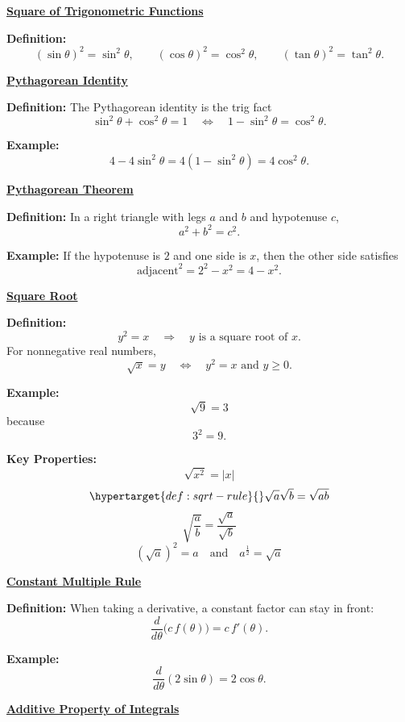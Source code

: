 \documentclass{article}
\newcommand{\defanchor}[1]{\hypertarget{def:#1}{}}
\newcommand{\backtoterm}[2]{\hyperlink{q:#1}{\textbf{#2}}}
\begin{document}
    \defanchor{notation}\backtoterm{notation}{Square of Trigonometric Functions}

    \textbf{Definition:}
    \[
    (\sin\theta)^2=\sin^2\theta,\qquad
    (\cos\theta)^2=\cos^2\theta,\qquad
    (\tan\theta)^2=\tan^2\theta.
    \]

    \defanchor{pyth-id}\backtoterm{pyth-id}{Pythagorean Identity}

    \textbf{Definition:}
    The Pythagorean identity is the trig fact
    \[
    \sin^2\theta+\cos^2\theta=1
    \quad\Longleftrightarrow\quad
    1-\sin^2\theta=\cos^2\theta.
    \]

    \textbf{Example:}
    \[
    4-4\sin^2\theta=4(1-\sin^2\theta)=4\cos^2\theta.
    \]

    \defanchor{pyth-thm}\backtoterm{pyth-thm}{Pythagorean Theorem}

    \textbf{Definition:}
    In a right triangle with legs $a$ and $b$ and hypotenuse $c$,
    \[
    a^2+b^2=c^2.
    \]

    \textbf{Example:}
    If the hypotenuse is $2$ and one side is $x$, then the other side satisfies
    \[
    \text{adjacent}^2=2^2-x^2=4-x^2.
    \]

    \defanchor{square-root}\backtoterm{square-root}{Square Root}

    \textbf{Definition:}
    \[
    y^2=x
    \quad\Longrightarrow\quad
    y \text{ is a square root of } x.
    \]
    For nonnegative real numbers,
    \[
    \sqrt{x}=y
    \quad\Longleftrightarrow\quad
    y^2=x \text{ and } y\ge 0.
    \]

    \textbf{Example:}
    \[
    \sqrt{9}=3
    \]
    because
    \[
    3^2=9.
    \]

    \textbf{Key Properties:}
    \[
    \sqrt{x^2}=|x|
    \]
    \[
    \defanchor{sqrt-rule}\sqrt{a}\sqrt{b}=\sqrt{ab}
    \]
    \[
    \sqrt{\frac{a}{b}}=\frac{\sqrt{a}}{\sqrt{b}}
    \]
    \[
    \left(\sqrt{a}\right)^2=a
    \quad\text{and}\quad
    a^\frac{1}{2}=\sqrt{a}
    \]

    \defanchor{const-mult}\backtoterm{const-mult}{Constant Multiple Rule}

    \textbf{Definition:}
    When taking a derivative, a constant factor can stay in front:
    \[
    \frac{d}{d\theta}\bigl(c\,f(\theta)\bigr)=c\,f'(\theta).
    \]

    \textbf{Example:}
    \[
    \frac{d}{d\theta}(2\sin\theta)=2\cos\theta.
    \]

    \defanchor{add-int}\backtoterm{add-int}{Additive Property of Integrals}
\end{document}
